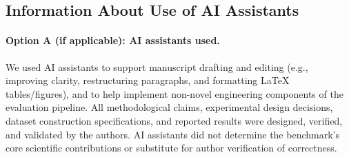 \documentclass{article}
\begin{document}
\subsection{Information About Use of AI Assistants}
\label{sec:checklist-e1}
\paragraph{Option A (if applicable): AI assistants used.}
We used AI assistants to support manuscript drafting and editing (e.g., improving clarity, restructuring paragraphs, and formatting LaTeX tables/figures), and to help implement non-novel engineering components of the evaluation pipeline.
All methodological claims, experimental design decisions, dataset construction specifications, and reported results were designed, verified, and validated by the authors.
AI assistants did not determine the benchmark’s core scientific contributions or substitute for author verification of correctness.
\end{document}
